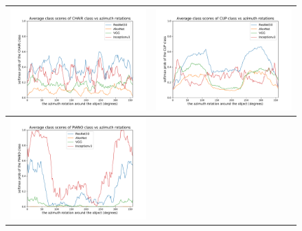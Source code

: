 \begin{figure}[h]
\centering
\tabcolsep=0.03cm
   \begin{tabular}{c|c}
\includegraphics[width = 9cm]{supimages/nms1d/average_azimuth_performance_CHAIR.pdf}&
\includegraphics[width = 9cm]{supimages/nms1d/average_azimuth_performance_CUP.pdf}\\\hline
\includegraphics[width = 9cm]{supimages/nms1d/average_azimuth_performance_PIANO.pdf}&

\end{tabular}
\end{figure}
